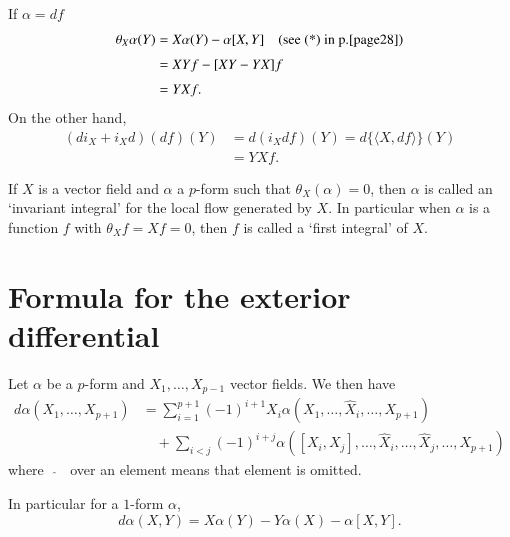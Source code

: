 If $\alpha=df$
\begin{align*}
\theta_{X}\alpha(Y) &= X\alpha(Y)-\alpha[X,Y]\quad \text{(see (*) in p.\pageref{page28})}\\[3pt]
&= XYf-[XY-YX]f\\[3pt]
&= YXf.
\end{align*}
On the other hand,
\begin{align*}
(di_{X}+i_{X}d)(df)(Y) &= d(i_{X}df)(Y)=d\{\langle X,df\rangle\}(Y)\\[3pt]
                     &= YXf.
\end{align*}

\begin{remark*}
If $X$ is a vector field and $\alpha$ a $p$-form such that $\theta_{X}(\alpha)=0$, then $\alpha$ is called an `invariant integral' for the local flow generated by $X$. In particular when $\alpha$ is a function $f$ with $\theta_{X}f=Xf=0$, then $f$ is called a `first integral' of $X$.
\end{remark*}

\section*{Formula for the exterior differential}

\begin{proposition}\label{chap6-prop6.6}
Let\label{page30} $\alpha$ be a $p$-form and $X_{1},\ldots,X_{p-1}$ vector fields. We then have
\begin{align*}
d\alpha(X_{1},\ldots,X_{p+1}) &= \sum\limits^{p+1}_{i=1}(-1)^{i+1}X_{i}\alpha(X_{1},\ldots,\widehat{X}_{i},\ldots,X_{p+1})\\[3pt]
&\quad +\sum\limits_{i<j}(-1)^{i+j}\alpha\left([X_{i},X_{j}],\ldots,\widehat{X}_{i},\ldots,\widehat{X}_{j},\ldots,X_{p+1}\right)
\end{align*}
where~ $\widehat{~}$~ over an element means that element is omitted.
\end{proposition}

In particular for a $1$-form $\alpha$,
$$
d\alpha (X,Y)=X\alpha(Y)-Y\alpha(X)-\alpha[X,Y].
$$

